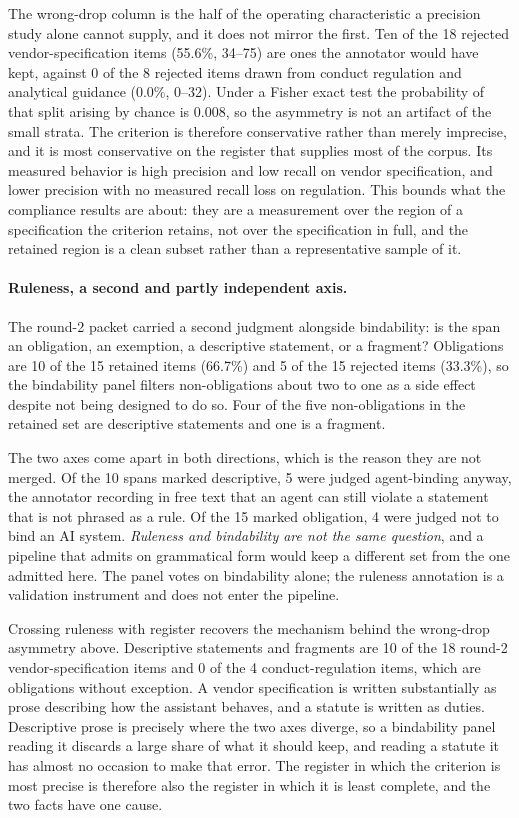 \documentclass{article}
\begin{document}
The wrong-drop column is the half of the operating characteristic a precision study alone cannot
supply, and it does not mirror the first. Ten of the 18 rejected vendor-specification items
(55.6\%, 34--75) are ones the annotator would have kept, against 0 of the 8 rejected items drawn
from conduct regulation and analytical guidance (0.0\%, 0--32). Under a Fisher exact test the
probability of that split arising by chance is $0.008$, so the asymmetry is not an artifact of
the small strata. The criterion is therefore conservative rather than merely imprecise, and it
is most conservative on the register that supplies most of the corpus. Its measured behavior is
high precision and low recall on vendor specification, and lower precision with no measured
recall loss on regulation. This bounds what the compliance results are about: they are a
measurement over the region of a specification the criterion retains, not over the specification
in full, and the retained region is a clean subset rather than a representative sample of it.

\paragraph{Ruleness, a second and partly independent axis.}
The round-2 packet carried a second judgment alongside bindability: is the span an obligation,
an exemption, a descriptive statement, or a fragment? Obligations are 10 of the 15 retained
items (66.7\%) and 5 of the 15 rejected items (33.3\%), so the bindability panel filters
non-obligations about two to one as a side effect despite not being designed to do so. Four of
the five non-obligations in the retained set are descriptive statements and one is a fragment.

The two axes come apart in both directions, which is the reason they are not merged. Of the 10
spans marked descriptive, 5 were judged agent-binding anyway, the annotator recording in free
text that an agent can still violate a statement that is not phrased as a rule. Of the 15 marked
obligation, 4 were judged not to bind an AI system. \emph{Ruleness and bindability are not the
same question}, and a pipeline that admits on grammatical form would keep a different set from
the one admitted here. The panel votes on bindability alone; the ruleness annotation is a
validation instrument and does not enter the pipeline.

Crossing ruleness with register recovers the mechanism behind the wrong-drop asymmetry above.
Descriptive statements and fragments are 10 of the 18 round-2 vendor-specification items and 0
of the 4 conduct-regulation items, which are obligations without exception. A vendor
specification is written substantially as prose describing how the assistant behaves, and a
statute is written as duties. Descriptive prose is precisely where the two axes diverge, so a
bindability panel reading it discards a large share of what it should keep, and reading a
statute it has almost no occasion to make that error. The register in which the criterion is
most precise is therefore also the register in which it is least complete, and the two facts
have one cause.
\end{document}
